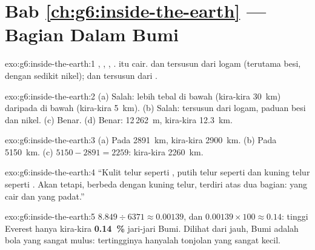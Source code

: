 \section*{Bab \ref{ch:g6:inside-the-earth} --- Bagian Dalam Bumi}

\begin{solution}{exo:g6:inside-the-earth:1}
, , , .  itu cair.  dan
 tersusun dari logam (terutama besi, dengan sedikit nikel); 
dan  tersusun dari .
\end{solution}

\begin{solution}{exo:g6:inside-the-earth:2}
(a) Salah:  lebih tebal di bawah  (kira-kira 30~km) daripada di
bawah  (kira-kira 5~km). (b) Salah:  tersusun dari logam, paduan
besi dan nikel. (c) Benar. (d) Benar: 12\,262~m, kira-kira 12.3~km.
\end{solution}

\begin{solution}{exo:g6:inside-the-earth:3}
(a) Pada 2891~km, kira-kira 2900~km. (b) Pada 5150~km. (c) $5150 - 2891 = 2259$:
kira-kira 2260~km.
\end{solution}

\begin{solution}{exo:g6:inside-the-earth:4}
``Kulit telur seperti \underline{}, putih telur seperti
\underline{} dan kuning telur seperti \underline{}. Akan tetapi,
berbeda dengan kuning telur, \underline{} terdiri atas dua bagian:
\underline{} yang cair dan \underline{} yang padat.''
\end{solution}

\begin{solution}{exo:g6:inside-the-earth:5}
$8.849 \div 6371 \approx 0.00139$, dan $0.00139 \times 100 \approx 0.14$:
tinggi Everest hanya kira-kira \textbf{0.14~\%} jari-jari Bumi. Dilihat
dari jauh, Bumi adalah bola yang sangat mulus:  tertingginya hanyalah
tonjolan yang sangat kecil.
\end{solution}

